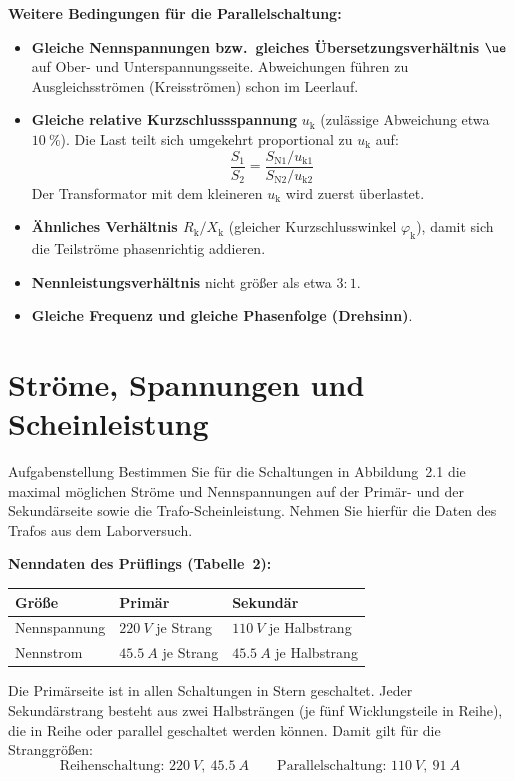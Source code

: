 \textbf{Weitere Bedingungen für die Parallelschaltung:}
\begin{itemize}[nosep]
  \item \textbf{Gleiche Nennspannungen bzw.\ gleiches Übersetzungsverhältnis} $\ue$ auf Ober- und Unterspannungsseite. Abweichungen führen zu Ausgleichsströmen (Kreisströmen) schon im Leerlauf.
  \item \textbf{Gleiche relative Kurzschlussspannung} $u_\mathrm{k}$ (zulässige Abweichung etwa $\SI{10}{\percent}$). Die Last teilt sich umgekehrt proportional zu $u_\mathrm{k}$ auf:
  \begin{equation*}
    \frac{S_1}{S_2} = \frac{S_\mathrm{N1}/u_\mathrm{k1}}{S_\mathrm{N2}/u_\mathrm{k2}}
  \end{equation*}
  Der Transformator mit dem kleineren $u_\mathrm{k}$ wird zuerst überlastet.
  \item \textbf{Ähnliches Verhältnis $R_\mathrm{k}/X_\mathrm{k}$} (gleicher Kurzschlusswinkel $\varphi_\mathrm{k}$), damit sich die Teilströme phasenrichtig addieren.
  \item \textbf{Nennleistungsverhältnis} nicht größer als etwa $3:1$.
  \item \textbf{Gleiche Frequenz und gleiche Phasenfolge (Drehsinn)}.
\end{itemize}

\section{Ströme, Spannungen und Scheinleistung}\label{sec:a2}

\begin{aufgabe}{Aufgabenstellung}
Bestimmen Sie für die Schaltungen in Abbildung~2.1 die maximal möglichen Ströme und Nennspannungen auf der Primär- und der Sekundärseite sowie die Trafo-Scheinleistung. Nehmen Sie hierfür die Daten des Trafos aus dem Laborversuch.
\end{aufgabe}

\textbf{Nenndaten des Prüflings (Tabelle~2):}
\begin{center}
\begin{tabular}{@{}lll@{}}
\toprule
Größe & Primär & Sekundär\\
\midrule
Nennspannung & $\SI{220}{V}$ je Strang & $\SI{110}{V}$ je Halbstrang\\
Nennstrom & $\SI{45.5}{A}$ je Strang & $\SI{45.5}{A}$ je Halbstrang\\
\bottomrule
\end{tabular}
\end{center}
Die Primärseite ist in allen Schaltungen in Stern geschaltet. Jeder Sekundärstrang besteht aus zwei Halbsträngen (je fünf Wicklungsteile in Reihe), die in Reihe oder parallel geschaltet werden können. Damit gilt für die Stranggrößen:
\begin{equation*}
  \text{Reihenschaltung: } \SI{220}{V},\ \SI{45.5}{A}
  \qquad
  \text{Parallelschaltung: } \SI{110}{V},\ \SI{91}{A}
\end{equation*}

